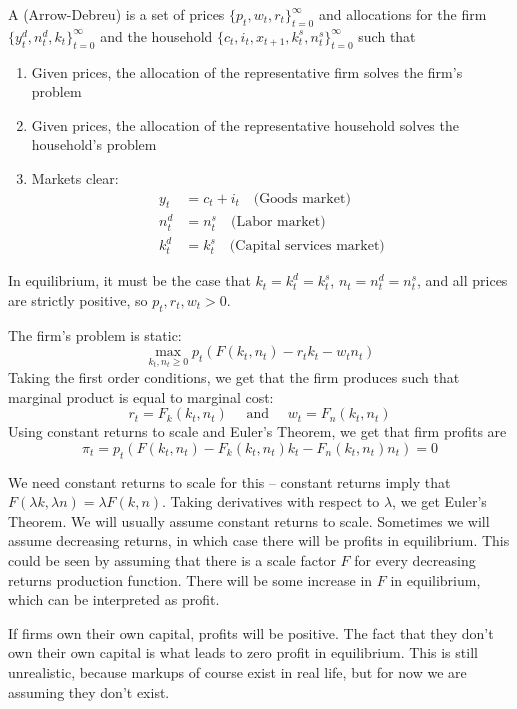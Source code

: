 \documentclass[10pt]{article}
\begin{document}
\begin{definition}
	A  (Arrow-Debreu) is a set of prices $\{p_t,w_t,r_t\}_{t=0}^\infty$ and allocations for the firm $\{y_t^d,n_t^d,k_t\}_{t=0}^\infty$ and the household $\{c_t,i_t,x_{t+1},k_t^s,n_t^s\}_{t=0}^\infty$ such that
	\begin{enumerate}
		\item Given prices, the allocation of the representative firm solves the firm's problem
		\item Given prices, the allocation of the representative household solves the household's problem
		\item Markets clear:
		\begin{align*}
			y_t &= c_t + i_t \quad\text{(Goods market)} \\
			n^d_t &= n^s_t \quad\text{(Labor market)} \\
			k^d_t &= k^s_t \quad\text{(Capital services market)}
		\end{align*}
	\end{enumerate}
	In equilibrium, it must be the case that $k_t = k_t^d = k_t^s$, $n_t = n_t^d = n_t^s$, and all prices are strictly positive, so $p_t,r_t,w_t > 0$. 
\end{definition}

The firm's problem is static:
\[
\max_{k_t,n_t \ge 0} p_t(F(k_t,n_t) - r_t k_t - w_t n_t)
\]
Taking the first order conditions, we get that the firm produces such that marginal product is equal to marginal cost:
\[
r_t = F_k(k_t,n_t) \quad \text{ and } \quad w_t = F_n(k_t,n_t)
\]
Using constant returns to scale and Euler's Theorem, we get that firm profits are
\[
\pi_t = p_t(F(k_t,n_t) - F_k(k_t,n_t)k_t - F_n(k_t,n_t)n_t) = 0
\]
\begin{remark}
	We need constant returns to scale for this -- constant returns imply that $F(\lambda k,\lambda n) = \lambda F(k,n)$. Taking derivatives with respect to $\lambda$, we get Euler's Theorem. We will usually assume constant returns to scale. Sometimes we will assume decreasing returns, in which case there will be profits in equilibrium. This could be seen by assuming that there is a scale factor $F$ for every decreasing returns production function. There will be some increase in $F$ in equilibrium, which can be interpreted as profit. 
\end{remark}

\begin{remark}
	If firms own their own capital, profits will be positive. The fact that they don't own their own capital is what leads to zero profit in equilibrium. This is still unrealistic, because markups of course exist in real life, but for now we are assuming they don't exist.
\end{remark}
\end{document}
